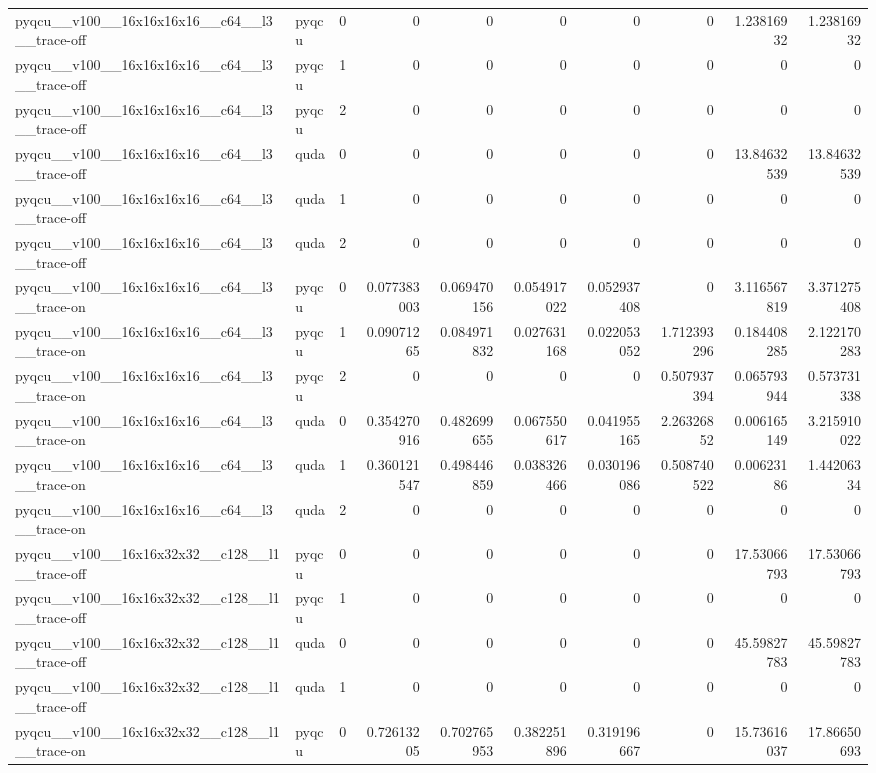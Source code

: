 \begin{table}[htbp]
\begin{tabular}{@{}llrrrrrrrr@{}}
pyqcu\_\_v100\_\_16x16x16x16\_\_c64\_\_l3\_\_trace-off & pyqcu & 0 & 0 & 0 & 0 & 0 & 0 & 1.23816932 & 1.23816932 \\
pyqcu\_\_v100\_\_16x16x16x16\_\_c64\_\_l3\_\_trace-off & pyqcu & 1 & 0 & 0 & 0 & 0 & 0 & 0 & 0 \\
pyqcu\_\_v100\_\_16x16x16x16\_\_c64\_\_l3\_\_trace-off & pyqcu & 2 & 0 & 0 & 0 & 0 & 0 & 0 & 0 \\
pyqcu\_\_v100\_\_16x16x16x16\_\_c64\_\_l3\_\_trace-off & quda & 0 & 0 & 0 & 0 & 0 & 0 & 13.84632539 & 13.84632539 \\
pyqcu\_\_v100\_\_16x16x16x16\_\_c64\_\_l3\_\_trace-off & quda & 1 & 0 & 0 & 0 & 0 & 0 & 0 & 0 \\
pyqcu\_\_v100\_\_16x16x16x16\_\_c64\_\_l3\_\_trace-off & quda & 2 & 0 & 0 & 0 & 0 & 0 & 0 & 0 \\
pyqcu\_\_v100\_\_16x16x16x16\_\_c64\_\_l3\_\_trace-on & pyqcu & 0 & 0.077383003 & 0.069470156 & 0.054917022 & 0.052937408 & 0 & 3.116567819 & 3.371275408 \\
pyqcu\_\_v100\_\_16x16x16x16\_\_c64\_\_l3\_\_trace-on & pyqcu & 1 & 0.09071265 & 0.084971832 & 0.027631168 & 0.022053052 & 1.712393296 & 0.184408285 & 2.122170283 \\
pyqcu\_\_v100\_\_16x16x16x16\_\_c64\_\_l3\_\_trace-on & pyqcu & 2 & 0 & 0 & 0 & 0 & 0.507937394 & 0.065793944 & 0.573731338 \\
pyqcu\_\_v100\_\_16x16x16x16\_\_c64\_\_l3\_\_trace-on & quda & 0 & 0.354270916 & 0.482699655 & 0.067550617 & 0.041955165 & 2.26326852 & 0.006165149 & 3.215910022 \\
pyqcu\_\_v100\_\_16x16x16x16\_\_c64\_\_l3\_\_trace-on & quda & 1 & 0.360121547 & 0.498446859 & 0.038326466 & 0.030196086 & 0.508740522 & 0.00623186 & 1.44206334 \\
pyqcu\_\_v100\_\_16x16x16x16\_\_c64\_\_l3\_\_trace-on & quda & 2 & 0 & 0 & 0 & 0 & 0 & 0 & 0 \\
pyqcu\_\_v100\_\_16x16x32x32\_\_c128\_\_l1\_\_trace-off & pyqcu & 0 & 0 & 0 & 0 & 0 & 0 & 17.53066793 & 17.53066793 \\
pyqcu\_\_v100\_\_16x16x32x32\_\_c128\_\_l1\_\_trace-off & pyqcu & 1 & 0 & 0 & 0 & 0 & 0 & 0 & 0 \\
pyqcu\_\_v100\_\_16x16x32x32\_\_c128\_\_l1\_\_trace-off & quda & 0 & 0 & 0 & 0 & 0 & 0 & 45.59827783 & 45.59827783 \\
pyqcu\_\_v100\_\_16x16x32x32\_\_c128\_\_l1\_\_trace-off & quda & 1 & 0 & 0 & 0 & 0 & 0 & 0 & 0 \\
pyqcu\_\_v100\_\_16x16x32x32\_\_c128\_\_l1\_\_trace-on & pyqcu & 0 & 0.72613205 & 0.702765953 & 0.382251896 & 0.319196667 & 0 & 15.73616037 & 17.86650693 \\

\end{tabular}
\end{table}
